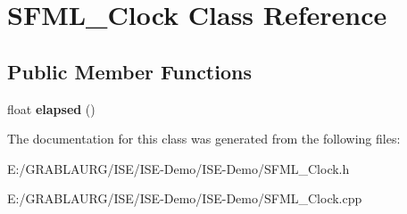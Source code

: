 \hypertarget{class_s_f_m_l___clock}{\section{S\-F\-M\-L\-\_\-\-Clock Class Reference}
\label{class_s_f_m_l___clock}
}
\subsection*{Public Member Functions}
\begin{DoxyCompactItemize}
\item 
\hypertarget{class_s_f_m_l___clock_a85bb772cc6c23340d7cc313a581602f4}{float {\bfseries elapsed} ()}\label{class_s_f_m_l___clock_a85bb772cc6c23340d7cc313a581602f4}

\end{DoxyCompactItemize}


The documentation for this class was generated from the following files\-:\begin{DoxyCompactItemize}
\item 
E\-:/\-G\-R\-A\-B\-L\-A\-U\-R\-G/\-I\-S\-E/\-I\-S\-E-\/\-Demo/\-I\-S\-E-\/\-Demo/S\-F\-M\-L\-\_\-\-Clock.\-h\item 
E\-:/\-G\-R\-A\-B\-L\-A\-U\-R\-G/\-I\-S\-E/\-I\-S\-E-\/\-Demo/\-I\-S\-E-\/\-Demo/S\-F\-M\-L\-\_\-\-Clock.\-cpp\end{DoxyCompactItemize}
